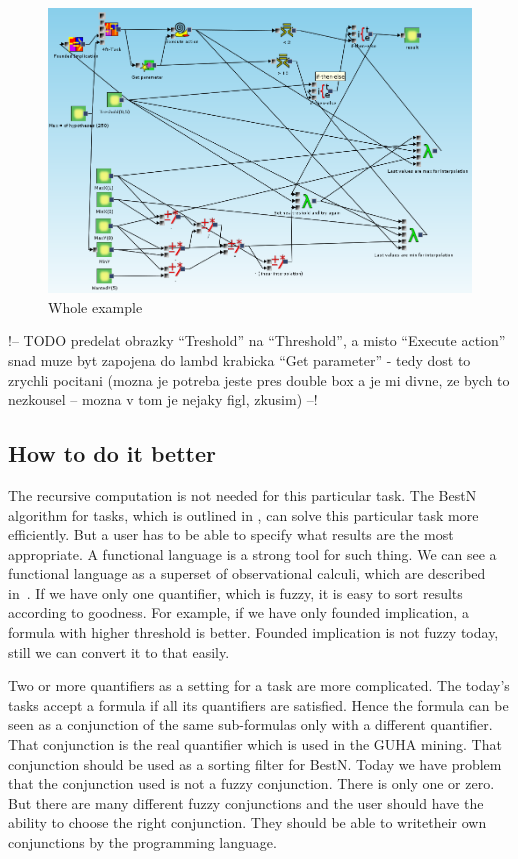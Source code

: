 \documentclass[a4paper,12pt]{book}
\begin{document}
\begin{figure}
	\includegraphics[width=1\textwidth]{exampleResult}
	\caption{Whole example}
	\label{fig:exampleResult}
\end{figure}

!-- TODO predelat obrazky ``Treshold'' na ``Threshold'', a misto ``Execute action'' snad muze byt zapojena do lambd krabicka ``Get parameter'' - tedy dost to zrychli pocitani (mozna je potreba jeste pres double box a je mi divne, ze bych to nezkousel -- mozna v tom je nejaky figl, zkusim) --!

\subsection{How to do it better}
The recursive computation is not needed for this particular task. The BestN algorithm for tasks, which is outlined in \cite{thesisKuchar}, can solve this particular task more efficiently. But a user has to be able to specify what results are the most appropriate. A functional language is a strong tool for such thing. We can see a functional language as a superset of observational calculi, which are described in~\cite{GUHAbook}. If we have only one quantifier, which is fuzzy, it is easy to sort results according to goodness. For example, if we have only founded implication, a formula with higher threshold is better. Founded implication is not fuzzy today, still we can convert it to that easily.

Two or more quantifiers as a setting for a task are more complicated. The today's tasks accept a formula if all its quantifiers are satisfied. Hence the formula can be seen as a conjunction of the same sub-formulas only with a different quantifier. That conjunction is the real quantifier which is used in the GUHA mining. That conjunction should be used as a sorting filter for BestN. Today we have problem that the conjunction used is not a fuzzy conjunction. There is only one or zero. But there are many different fuzzy conjunctions and the user should have the ability to choose the right conjunction. They should be able to writetheir own conjunctions by the programming language.
\end{document}
